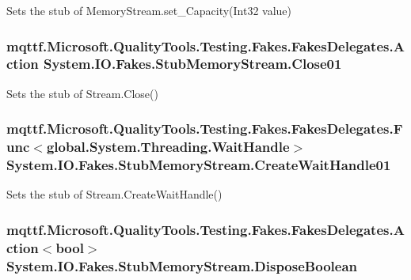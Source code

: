 Sets the stub of Memory\-Stream.\-set\-\_\-\-Capacity(\-Int32 value)

\hypertarget{class_system_1_1_i_o_1_1_fakes_1_1_stub_memory_stream_a02c7e809d8a389eecffeb6ce89fb7511}{
\subsubsection[{Close01}]{\setlength{\rightskip}{0pt plus 5cm}mqttf.\-Microsoft.\-Quality\-Tools.\-Testing.\-Fakes.\-Fakes\-Delegates.\-Action System.\-I\-O.\-Fakes.\-Stub\-Memory\-Stream.\-Close01}}\label{class_system_1_1_i_o_1_1_fakes_1_1_stub_memory_stream_a02c7e809d8a389eecffeb6ce89fb7511}


Sets the stub of Stream.\-Close()

\hypertarget{class_system_1_1_i_o_1_1_fakes_1_1_stub_memory_stream_a3215faac1e5904fe30cb105336a4fbd3}{
\subsubsection[{Create\-Wait\-Handle01}]{\setlength{\rightskip}{0pt plus 5cm}mqttf.\-Microsoft.\-Quality\-Tools.\-Testing.\-Fakes.\-Fakes\-Delegates.\-Func$<$global.\-System.\-Threading.\-Wait\-Handle$>$ System.\-I\-O.\-Fakes.\-Stub\-Memory\-Stream.\-Create\-Wait\-Handle01}}\label{class_system_1_1_i_o_1_1_fakes_1_1_stub_memory_stream_a3215faac1e5904fe30cb105336a4fbd3}


Sets the stub of Stream.\-Create\-Wait\-Handle()

\hypertarget{class_system_1_1_i_o_1_1_fakes_1_1_stub_memory_stream_a2cd004aa8c77d04474b973e54004d123}{
\subsubsection[{Dispose\-Boolean}]{\setlength{\rightskip}{0pt plus 5cm}mqttf.\-Microsoft.\-Quality\-Tools.\-Testing.\-Fakes.\-Fakes\-Delegates.\-Action$<$bool$>$ System.\-I\-O.\-Fakes.\-Stub\-Memory\-Stream.\-Dispose\-Boolean}}\label{class_system_1_1_i_o_1_1_fakes_1_1_stub_memory_stream_a2cd004aa8c77d04474b973e54004d123}


